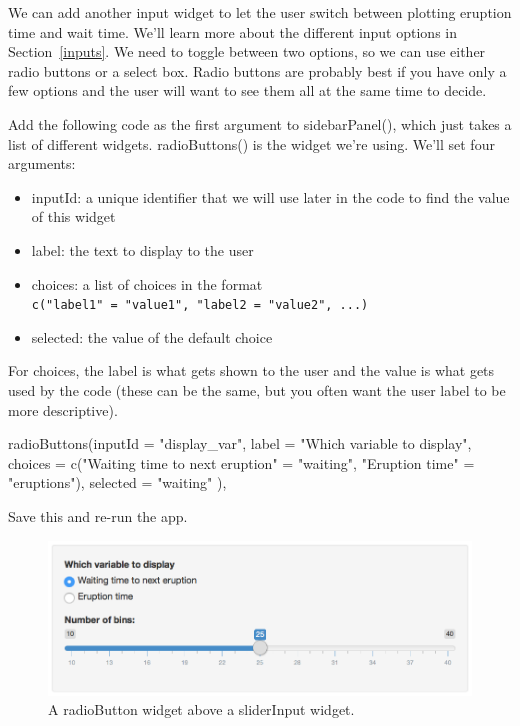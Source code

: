 \documentclass[
]{book}
\newenvironment{Shaded}{\begin{snugshade}}{\end{snugshade}}
\newcommand{\AttributeTok}[1]{\textcolor[rgb]{0.77,0.63,0.00}{#1}}
\newcommand{\FunctionTok}[1]{\textcolor[rgb]{0.00,0.00,0.00}{#1}}
\newcommand{\NormalTok}[1]{#1}
\newcommand{\OtherTok}[1]{\textcolor[rgb]{0.56,0.35,0.01}{#1}}
\newcommand{\StringTok}[1]{\textcolor[rgb]{0.31,0.60,0.02}{#1}}
\providecommand{\tightlist}{%
  \setlength{\itemsep}{0pt}\setlength{\parskip}{0pt}}
\begin{document}
We can add another input widget to let the user switch between plotting eruption time and wait time. We'll learn more about the different input options in Section~\ref{inputs}. We need to toggle between two options, so we can use either radio buttons or a select box. Radio buttons are probably best if you have only a few options and the user will want to see them all at the same time to decide.

Add the following code as the first argument to sidebarPanel(), which just takes a list of different widgets. radioButtons() is the widget we're using. We'll set four arguments:

\begin{itemize}
\tightlist
\item
  inputId: a unique identifier that we will use later in the code to find the value of this widget
\item
  label: the text to display to the user
\item
  choices: a list of choices in the format \texttt{c("label1"\ =\ "value1",\ "label2\ =\ "value2",\ ...)}
\item
  selected: the value of the default choice
\end{itemize}

For choices, the label is what gets shown to the user and the value is what gets used by the code (these can be the same, but you often want the user label to be more descriptive).

\begin{Shaded}
\begin{Highlighting}[]
         \FunctionTok{radioButtons}\NormalTok{(}\AttributeTok{inputId =} \StringTok{"display\_var"}\NormalTok{,}
                      \AttributeTok{label =} \StringTok{"Which variable to display"}\NormalTok{,}
                      \AttributeTok{choices =} \FunctionTok{c}\NormalTok{(}\StringTok{"Waiting time to next eruption"} \OtherTok{=} \StringTok{"waiting"}\NormalTok{,}
                                  \StringTok{"Eruption time"} \OtherTok{=} \StringTok{"eruptions"}\NormalTok{),}
                      \AttributeTok{selected =} \StringTok{"waiting"}
\NormalTok{         ),}
\end{Highlighting}
\end{Shaded}

Save this and re-run the app.

\begin{figure}

{\centering \includegraphics[width=1\linewidth]{images/demo_app/08-radiobutton-widget} 

}

\caption{A radioButton widget above a sliderInput widget.}\label{fig:first-radiobutton-widget}
\end{figure}
\end{document}
